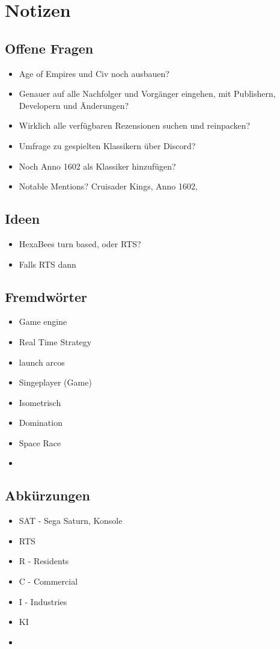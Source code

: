 \section*{Notizen}
\subsection*{Offene Fragen}
\begin{itemize}
    \item Age of Empires und Civ noch ausbauen?
    \item Genauer auf alle Nachfolger und Vorgänger eingehen, mit Publishern, Developern und Änderungen?
    \item Wirklich alle verfügbaren Rezensionen suchen und reinpacken?
    \item Umfrage zu gespielten Klassikern über Discord?
    \item Noch Anno 1602 als Klassiker hinzufügen?
    \item Notable Mentions? Cruisader Kings, Anno 1602, 
\end{itemize}

\subsection*{Ideen}
\begin{itemize}
    \item HexaBees turn based, oder RTS?
    \item Falls RTS dann 
\end{itemize}

\subsection*{Fremdwörter}
\begin{itemize}
    \item Game engine
    \item Real Time Strategy
    \item launch arcos
    \item Singeplayer (Game)
    \item Isometrisch
    \item Domination
    \item Space Race
    \item 
\end{itemize}

\subsection*{Abkürzungen}
\begin{itemize}
    \item SAT - Sega Saturn, Konsole
    \item RTS
    \item R - Residents
    \item C - Commercial
    \item I - Industries
    \item KI
    \item 
\end{itemize}